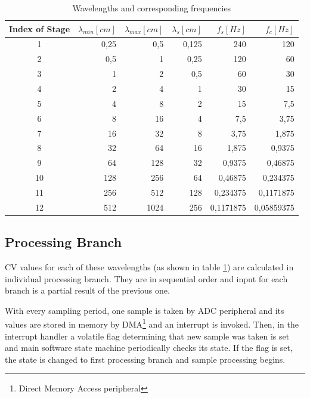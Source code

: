 \documentclass[twoside]{ctuthesis}
\theoremstyle{plain}
\theoremstyle{definition}
\theoremstyle{note}
\begin{document}
\begin{table}[htbp]
	\centering
	\caption{Wavelengths and corresponding frequencies}
	\begin{tabular}{crrrrr}
		\toprule
		Index of Stage & $\lambda_{min} [cm]$ & $\lambda_{max} [cm]$ & $\lambda_{s} [cm]$ & $f_s [Hz]$ & $f_c [Hz]$ \\
		\midrule
    1     & 0,25  & 0,5   & 0,125 & 240   & 120 \\
    2     & 0,5   & 1     & 0,25  & 120   & 60 \\
    3     & 1     & 2     & 0,5   & 60    & 30 \\
    4     & 2     & 4     & 1     & 30    & 15 \\
    5     & 4     & 8     & 2     & 15    & 7,5 \\
    6     & 8     & 16    & 4     & 7,5   & 3,75 \\
    7     & 16    & 32    & 8     & 3,75  & 1,875 \\
    8     & 32    & 64    & 16    & 1,875 & 0,9375 \\
    9     & 64    & 128   & 32    & 0,9375 & 0,46875 \\
    10    & 128   & 256   & 64    & 0,46875 & 0,234375 \\
    11    & 256   & 512   & 128   & 0,234375 & 0,1171875 \\
    12    & 512   & 1024  & 256   & 0,1171875 & 0,05859375 \\

		\bottomrule
	\end{tabular}%
	\label{tab:Wavelengths}%
\end{table}%

\subsection{Processing Branch}
CV values for each of these wavelengths (as shown in table \ref{tab:Wavelengths}) are calculated in individual processing branch. They are in sequential order and input for each branch is a partial result of the previous one.

With every sampling period, one sample is taken by ADC peripheral and its values are stored in memory by DMA\footnote{Direct Memory Access peripheral} and an interrupt is invoked. Then, in the interrupt handler a volatile flag determining that new sample was taken is set and main software state machine periodically checks its state. If the flag is set, the state is changed to first processing branch and sample processing begins.
\end{document}
